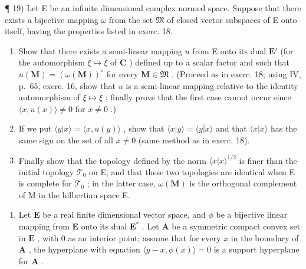 ¶ 19) Let E be an infinite dimensional complex normed space. Suppose that there exists a bijective mapping \(\omega\) from the set \(\mathfrak{M}\) of closed vector subspaces of E onto itself, having the properties listed in exerc. 18.

\begin{enumerate}
\def\labelenumi{\alph{enumi})}
\item
  Show that there exists a semi-linear mapping \(u\) from E onto its dual \(\mathbf{E}'\) (for the automorphism \(\xi \mapsto \overline{\xi}\) of \(\mathbf{C}\) ) defined up to a scalar factor and such that \(u(\mathbf{M}) = (\omega(\mathbf{M}))^\circ\) for every \(\mathbf{M} \in \mathfrak{M}\) . (Proceed as in exerc. 18; using IV, p.~65, exerc. 16, show that \(u\) is a semi-linear mapping relative to the identity automorphism of \(\xi \mapsto \overline{\xi}\) ; finally prove that the first case cannot occur since \(\langle x, u(x) \rangle \neq 0\) for \(x \neq 0\) .)
\item
  If we put \(\langle y|x\rangle = \langle x,u(y)\rangle\) , show that \(\langle x|y\rangle = \overline{\langle y|x\rangle}\) and that \(\langle x|x\rangle\) has the same sign on the set of all \(x\neq 0\) (same method as in exerc. 18).
\item
  Finally show that the topology defined by the norm \(\langle x|x\rangle^{1 / 2}\) is finer than the initial topology \(\mathcal{T}_0\) on E, and that these two topologies are identical when E is complete for \(\mathcal{T}_0\) ; in the latter case, \(\omega (\mathbf{M})\) is the orthogonal complement of M in the hilbertian space E.
\end{enumerate}

\begin{enumerate}
\def\labelenumi{\arabic{enumi})}
\setcounter{enumi}{19}
\tightlist
\item
  Let \(\mathbf{E}\) be a real finite dimensional vector space, and \(\phi\) be a bijective linear mapping from \(\mathbf{E}\) onto its dual \(\mathbf{E}^*\) . Let \(\mathbf{A}\) be a symmetric compact convex set in \(\mathbf{E}\) , with 0 as an interior point; assume that for every \(x\) in the boundary of \(\mathbf{A}\) , the hyperplane with equation \(\langle y - x, \phi(x) \rangle = 0\) is a support hyperplane for \(\mathbf{A}\) .
\end{enumerate}

